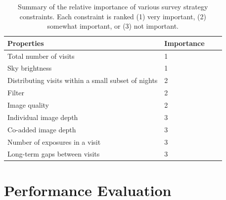 \documentclass[12pt, letterpaper]{article}
\begin{document}
\begin{table}[ht]
    \centering
    \begin{tabular}{|l|l|l|l|}
        \hline
        Properties & Importance \hspace{.3in} \\
        \hline
        Total number of visits & 1\\
        Sky brightness & 1\\
        Distributing visits within a small subset of nights & 2\\
        Filter & 2\\
        Image quality & 2\\
        Individual image depth & 3\\
        Co-added image depth & 3\\
        Number of exposures in a visit & 3\\
        Long-term gaps between visits & 3\\
        \hline
    \end{tabular}
    \caption{Summary of the relative importance of various survey strategy constraints. Each constraint is ranked (1) very important, (2) somewhat important, or (3) not important.}
        \label{tab:obs_constraints}
\end{table}

\section{Performance Evaluation}
\end{document}
